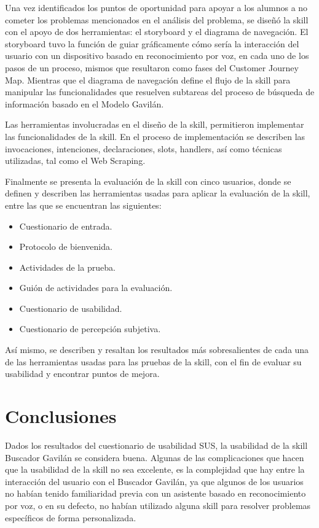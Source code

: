 Una vez identificados los puntos de oportunidad para apoyar a los alumnos a no cometer los problemas mencionados en el análisis del problema, se diseñó la skill con el apoyo de dos herramientas: el storyboard y el diagrama de navegación. El storyboard tuvo la función de guiar gráficamente cómo sería la interacción del usuario con un dispositivo basado en reconocimiento por voz, en cada uno de los pasos de un proceso, mismos que resultaron como fases del Customer Journey Map. Mientras que el diagrama de navegación define el flujo de la skill para manipular las funcionalidades que resuelven subtareas del proceso de búsqueda de información basado en el Modelo Gavilán.

Las herramientas involucradas en el diseño de la skill, permitieron implementar las funcionalidades de la skill. En el proceso de implementación se describen las invocaciones,  intenciones, declaraciones, slots, handlers, así como técnicas utilizadas, tal como el Web Scraping.

Finalmente se presenta la evaluación de la skill con cinco usuarios, donde se definen y describen las herramientas usadas para aplicar la evaluación de la skill, entre las que se encuentran las siguientes:

\begin{itemize}
  \item Cuestionario de entrada.
  \item Protocolo de bienvenida.
  \item Actividades de la prueba.
  \item Guión de actividades para la evaluación.
  \item Cuestionario de usabilidad.
  \item Cuestionario de percepción subjetiva.
\end{itemize}

Así mismo, se describen y resaltan los resultados más sobresalientes de cada una de las herramientas usadas para las pruebas de la skill, con el fin de evaluar su usabilidad y encontrar puntos de mejora.


\section{Conclusiones}
\label{ConclusionescapV}

Dados los resultados del cuestionario de usabilidad SUS, la usabilidad de la skill Buscador Gavilán se considera buena. Algunas de las complicaciones que hacen que la usabilidad de la skill no sea excelente, es la complejidad que hay entre la interacción del usuario con el Buscador Gavilán, ya que algunos de los usuarios no habían tenido familiaridad previa con un asistente basado en reconocimiento por voz, o en su defecto, no habían utilizado alguna skill para resolver problemas específicos de forma personalizada.

